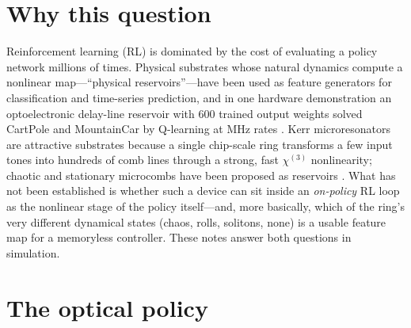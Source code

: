 \documentclass[10pt,a4paper]{article}
\begin{document}
\section{Why this question}
Reinforcement learning (RL) is dominated by the cost of evaluating a policy network millions of times.  Physical
substrates whose natural dynamics compute a nonlinear map---``physical reservoirs''---have been used as feature
generators for classification and time-series prediction, and in one hardware demonstration an optoelectronic delay-line
reservoir with 600 trained output weights solved CartPole and MountainCar by Q-learning at MHz rates
\cite{ref:sci_rep_2022}.  Kerr microresonators are attractive substrates because a single chip-scale ring transforms a
few input tones into hundreds of comb lines through a strong, fast $\chi^{(3)}$ nonlinearity; chaotic and stationary microcombs
have been proposed as reservoirs \cite{ref:prr_2025,ref:nanoph_2025}.  What has not been established is whether such a device can
sit inside an \emph{on-policy} RL loop as the nonlinear stage of the policy itself---and, more basically, which of the ring's very
different dynamical states (chaos, rolls, solitons, none) is a usable feature map for a memoryless controller.  These notes
answer both questions in simulation.

\section{The optical policy}
\end{document}
